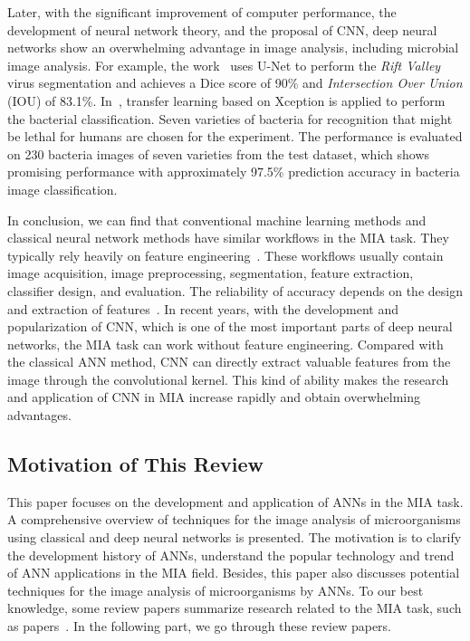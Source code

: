 Later, with the significant improvement of computer performance, the development of neural network theory, and the proposal of CNN, deep neural networks show an overwhelming advantage in image analysis, including microbial image analysis. For example, the work~\cite{Matuszewski-2018-MATS} uses U-Net to perform the \emph{Rift Valley} virus segmentation and achieves a Dice score of 90\% and \emph{Intersection Over Union} (IOU) of 83.1\%. In~\cite{Wahid-2019-DCNN}, transfer learning based on Xception is applied to perform the bacterial classification. Seven varieties of bacteria for recognition that might be lethal for humans are chosen for the experiment. The performance is evaluated on 230 bacteria images of seven varieties from the test dataset, which shows promising performance with approximately 97.5\% prediction accuracy in bacteria image classification.


In conclusion, we can find that conventional machine learning methods and classical neural network methods have similar workflows in the MIA task. They typically rely heavily on feature engineering~\cite{Al-2015-PEHC}. These workflows usually contain image acquisition, image preprocessing, segmentation, feature extraction, classifier design, and evaluation. The reliability of accuracy depends on the design and extraction of features~\cite{Al-2015-PEHC}. In recent years, with the development and popularization of CNN, which is one of the most important parts of deep neural networks, the MIA task can work without feature engineering. Compared with the classical ANN method, CNN can directly extract valuable features from the image through the convolutional kernel. This kind of ability makes the research and application of CNN in MIA increase rapidly and obtain overwhelming advantages.

\subsection{Motivation of This Review}
This paper focuses on the development and application of ANNs in the MIA task. A comprehensive overview of techniques for the image analysis of microorganisms using classical and deep neural networks is presented. The motivation is to clarify the development history of ANNs, understand the popular technology and trend of ANN applications in the MIA field. Besides, this paper also discusses potential techniques for the image analysis of microorganisms by ANNs. To our best knowledge, some review papers summarize research related to the MIA task, such as papers~\cite{Kulwa-2019-ASSM,Li-2020-ARCM,Li-2019-ASAC,Li-2018-ABRC,Zhang-2021-ACRI}. In the following part, we go through these review papers.

